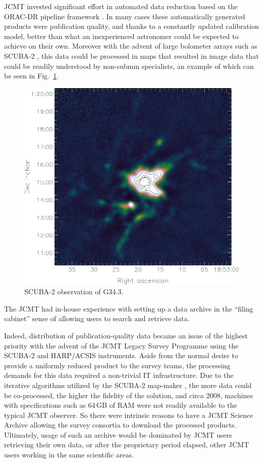 \documentclass[final,authoryear,5p,times,twocolumn]{elsarticle}
\begin{document}
JCMT invested significant effort in automated data reduction based on
the ORAC-DR pipeline framework
\citep[][]{1999ASPC..172...11E,1999ASPC..172..171J,2005ASPC..347..585G,2008ASPC..394..565J}. In
many cases these automatically generated products were publication
quality, and thanks to a constantly updated calibration model, better
than what an inexperienced astronomer could be expected to achieve on
their own. Moreover with the advent of large bolometer arrays such as
SCUBA-2 \citep{2013MNRAS.430.2513H}, this data could be processed in
maps that resulted in image data that could be readily understood by
non-submm specialists, an example of which can be seen in Fig.~\ref{fig:g34}.

\begin{figure}[t]
\includegraphics[width=\columnwidth]{g34}
\caption{SCUBA-2 observation of G34.3.}
\label{fig:g34}
\end{figure}

The JCMT had in-house experience with setting up a data archive in the
``filing cabinet'' sense of allowing users to search and retrieve data.

Indeed, distribution of publication-quality data became an issue of
the highest priority with the advent of the JCMT Legacy Survey
Programme \citep{2010HiA....15..797C,2008ASPC..394..450E} using the
SCUBA-2 and HARP/ACSIS \citep{2009MNRAS.399.1026B} instruments. Aside
from the normal desire to provide a uniformly reduced product to the
survey teams, the processing demands for this data required a
non-trivial IT infrastructure. Due to the iterative algorithms
utilized by the SCUBA-2 map-maker
\citep[SMURF;][]{2013MNRAS.430.2545C}, the more data could be
co-processed, the higher the fidelity of the solution, and circa 2008,
machines with specifications such as 64\,GB of RAM were not readily
available to the typical JCMT observer. So there were intrinsic
reasons to have a JCMT Science Archive allowing the survey consortia
to download the processed products. Ultimately, usage of such an
archive would be dominated by JCMT users retrieving their own data, or
after the proprietary period elapsed, other JCMT users working in the
same scientific areas.
\end{document}
